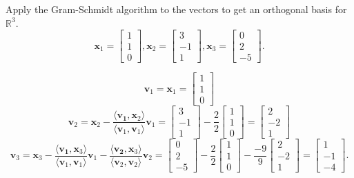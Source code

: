 \documentclass[11pt, answers]{exam}
\newcommand{\inner}[1]{\langle {#1} \rangle}
\newcommand{\R}{\mathbb{R}}
\begin{document}
\begin{questions}
\question Apply the Gram-Schmidt algorithm to the vectors to get an orthogonal basis for $\R^3$. 
$$\mathbf{x}_1 = \begin{bmatrix} 1 \\ 1 \\ 0 \end{bmatrix}, \mathbf{x}_2 = \begin{bmatrix} 3 \\ -1 \\ 1 \end{bmatrix}, \mathbf{x}_3 = \begin{bmatrix} 0 \\ 2 \\ -5 \end{bmatrix}.$$
\begin{solution}
$$\mathbf{v}_1 = \mathbf{x}_1 = \begin{bmatrix} 1 \\ 1 \\ 0 \end{bmatrix}$$
$$\mathbf{v}_2 = \mathbf{x}_2 - \frac{\inner{\mathbf{v_1}, \mathbf{x}_2}}{\inner{\mathbf{v}_1, \mathbf{v}_1}} \mathbf{v}_1 = \begin{bmatrix} 3 \\ -1 \\ 1 \end{bmatrix} - \frac{2}{2} \begin{bmatrix} 1 \\ 1 \\ 0 \end{bmatrix} = \begin{bmatrix} 2 \\ -2 \\ 1 \end{bmatrix}$$
$$\mathbf{v}_3 = \mathbf{x}_3 - \frac{\inner{\mathbf{v_1}, \mathbf{x}_3}}{\inner{\mathbf{v}_1, \mathbf{v}_1}} \mathbf{v}_1 -  \frac{\inner{\mathbf{v_2}, \mathbf{x}_3}}{\inner{\mathbf{v}_2, \mathbf{v}_2}} \mathbf{v}_2 = \begin{bmatrix} 0 \\ 2 \\ -5 \end{bmatrix} - \frac{2}{2} \begin{bmatrix} 1 \\ 1 \\ 0 \end{bmatrix}  - \frac{-9}{9} \begin{bmatrix} 2 \\ -2 \\ 1 \end{bmatrix} = \begin{bmatrix} 1 \\ -1 \\ -4 \end{bmatrix}.$$
\end{solution}
\vfill
\vfill


\end{questions}
\end{document}
